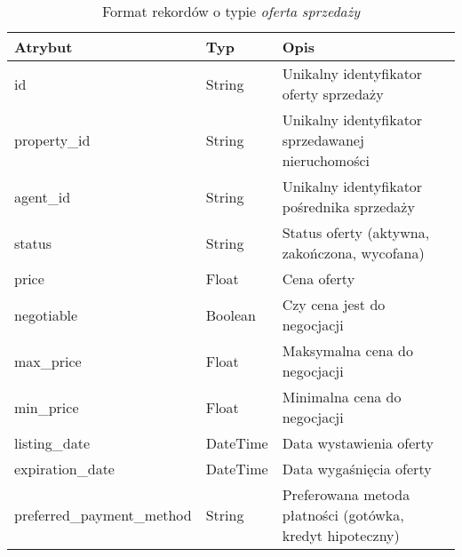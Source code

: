 \begin{table}[H]
    \caption{Format rekordów o typie \textit{oferta sprzedaży}}
    \centering
    \begin{tabular}{|l|l|l|}
    \hline
    \textbf{Atrybut} & \textbf{Typ} & \textbf{Opis} \\
    \hline
    id & String & Unikalny identyfikator oferty sprzedaży \\
    property\_id & String & Unikalny identyfikator sprzedawanej nieruchomości \\
    agent\_id & String & Unikalny identyfikator pośrednika sprzedaży \\
    status & String & Status oferty (aktywna, zakończona, wycofana) \\
    price & Float & Cena oferty \\
    negotiable & Boolean & Czy cena jest do negocjacji \\    
    max\_price & Float & Maksymalna cena do negocjacji \\
    min\_price & Float & Minimalna cena do negocjacji \\
    listing\_date & DateTime & Data wystawienia oferty \\
    expiration\_date & DateTime & Data wygaśnięcia oferty \\
    preferred\_payment\_method & String & Preferowana metoda płatności (gotówka, kredyt hipoteczny) \\
    \hline
    \end{tabular}
    \label{tab:sell_offer_details}
\end{table}

